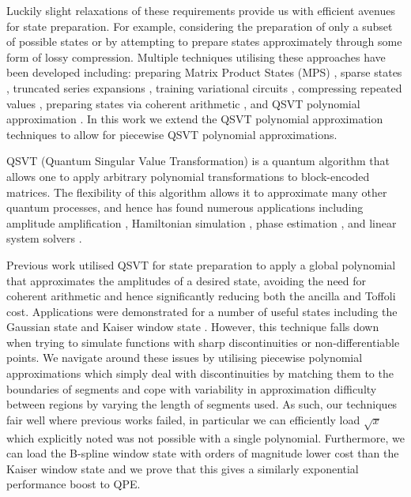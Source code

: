 \documentclass[a4paper,twocolumn,,accepted=2025-05-27]{quantumarticle}
\theoremstyle{empty}
\begin{document}
Luckily slight relaxations of these requirements provide us with efficient avenues for state preparation. For example, considering the preparation of only a subset of possible states or by attempting to prepare states approximately through some form of lossy compression. Multiple techniques utilising these approaches have been developed including: preparing Matrix Product States (MPS) \cite{Ran_2020, 9259933, Melnikov_2023, PhysRevA.101.010301, PhysRevResearch.4.043007, Iaconis:2023rna, PhysRevLett.132.040404}, sparse states \cite{Zhang2022}, truncated series expansions \cite{Welch_2014, Zylberman:2023knk, Moosa:2023ecz}, training variational circuits \cite{Zoufal_2019, Nakaji:2021dew, Marin-Sanchez:2021ast}, compressing repeated values \cite{Sunderhauf:2023xrz, PhysRevResearch.5.013200}, preparing states via coherent arithmetic \cite{Bhaskar:2015jjo, Haner:2018yea}, and QSVT polynomial approximation \cite{mcardleQuantumStatePreparation2022, Gonzalez-Conde:2023fjg}. In this work we extend the QSVT polynomial approximation techniques to allow for piecewise QSVT polynomial approximations.

QSVT (Quantum Singular Value Transformation) \cite{Gilyen:2018khw} is a quantum algorithm that allows one to apply arbitrary polynomial transformations to block-encoded matrices. The flexibility of this algorithm allows it to approximate many other quantum processes, and hence has found numerous applications including amplitude amplification  \cite{Gilyen:2018khw}, Hamiltonian simulation  \cite{Gilyen:2018khw}, phase estimation \cite{Martyn:2021eaf}, and linear system solvers \cite{Gilyen:2018khw}. 

Previous work utilised QSVT for state preparation to apply a global polynomial that approximates the amplitudes of a desired state, avoiding the need for coherent arithmetic and hence significantly reducing both the ancilla and Toffoli cost. Applications were demonstrated for a number of useful states including the Gaussian state and Kaiser window state \cite{mcardleQuantumStatePreparation2022}. However, this technique falls down when trying to simulate functions with sharp discontinuities or non-differentiable points. We navigate around these issues by utilising piecewise polynomial approximations which simply deal with discontinuities by matching them to the boundaries of segments and cope with variability in approximation difficulty between regions by varying the length of segments used. As such, our techniques fair well where previous works failed, in particular we can efficiently load $\sqrt{x}$ which \cite{mcardleQuantumStatePreparation2022} explicitly noted was not possible with a single polynomial. Furthermore, we can load the B-spline window state with orders of magnitude lower cost than the Kaiser window state and we prove that this gives a similarly exponential performance boost to QPE. 
\end{document}
